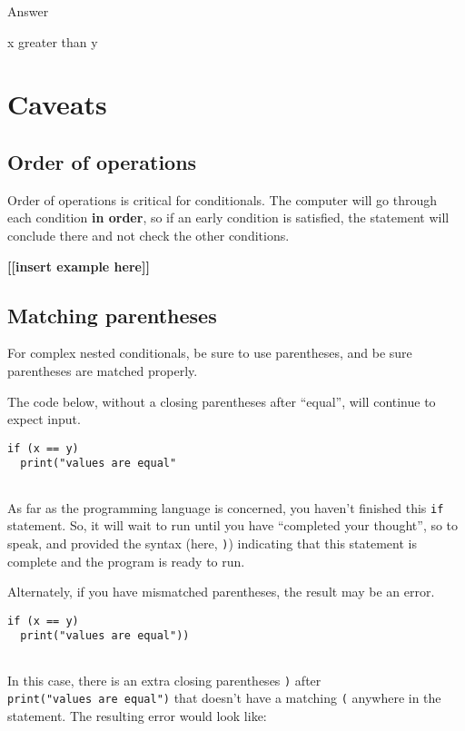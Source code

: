 \documentclass[
]{book}
\begin{document}
Answer

x greater than y

\hfill\break

\section{Caveats}\label{caveats-1}

\subsection{Order of operations}\label{order-of-operations}

Order of operations is critical for conditionals. The computer will go through each condition \textbf{in order}, so if an early condition is satisfied, the statement will conclude there and not check the other conditions.

\textbf{{[}{[}insert example here{]}{]}}

\subsection{Matching parentheses}\label{matching-parentheses}

For complex nested conditionals, be sure to use parentheses, and be sure parentheses are matched properly.

The code below, without a closing parentheses after ``equal'', will continue to expect input.

\begin{verbatim}
if (x == y) 
  print("values are equal"
  
\end{verbatim}

As far as the programming language is concerned, you haven't finished this \texttt{if} statement. So, it will wait to run until you have ``completed your thought'', so to speak, and provided the syntax (here, \texttt{)}) indicating that this statement is complete and the program is ready to run.

Alternately, if you have mismatched parentheses, the result may be an error.

\begin{verbatim}
if (x == y) 
  print("values are equal"))
  
\end{verbatim}

In this case, there is an extra closing parentheses \texttt{)} after \texttt{print("values\ are\ equal")} that doesn't have a matching \texttt{(} anywhere in the statement. The resulting error would look like:
\end{document}
